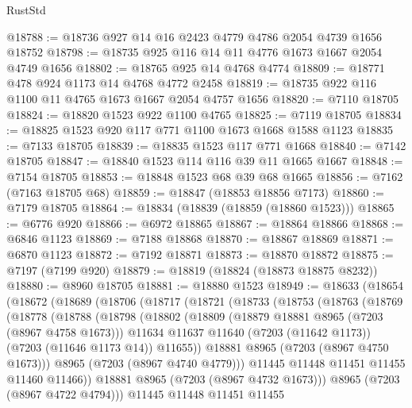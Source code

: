 \begin{lexlean}{RustStd}
\begin{coremodule}
@18788 := @18736 @927 @14 @16 @2423 @4779 @4786 @2054 @4739 @1656 @18752
@18798 := @18735 @925 @116 @14 @11 @4776 @1673 @1667 @2054 @4749 @1656
@18802 := @18765 @925 @14 @4768 @4774
@18809 := @18771 @478 @924 @1173 @14 @4768 @4772 @2458
@18819 := @18735 @922 @116 @1100 @11 @4765 @1673 @1667 @2054 @4757 @1656
@18820 := @7110 @18705
@18824 := @18820 @1523 @922 @1100 @4765
@18825 := @7119 @18705
@18834 := @18825 @1523 @920 @117 @771 @1100 @1673 @1668 @1588 @1123
@18835 := @7133 @18705
@18839 := @18835 @1523 @117 @771 @1668
@18840 := @7142 @18705
@18847 := @18840 @1523 @114 @116 @39 @11 @1665 @1667
@18848 := @7154 @18705
@18853 := @18848 @1523 @68 @39 @68 @1665
@18856 := @7162 (@7163 @18705 @68)
@18859 := @18847 (@18853 @18856 @7173)
@18860 := @7179 @18705
@18864 := @18834 (@18839 (@18859 (@18860 @1523)))
@18865 := @6776 @920
@18866 := @6972 @18865
@18867 := @18864 @18866
@18868 := @6846 @1123
@18869 := @7188 @18868
@18870 := @18867 @18869
@18871 := @6870 @1123
@18872 := @7192 @18871
@18873 := @18870 @18872
@18875 := @7197 (@7199 @920)
@18879 := @18819 (@18824 (@18873 @18875 @8232))
@18880 := @8960 @18705
@18881 := @18880 @1523
@18949 := @18633
    (@18654
      (@18672
        (@18689
          (@18706
            (@18717
              (@18721
                (@18733
                  (@18753
                    (@18763
                      (@18769
                        (@18778
                          (@18788
                            (@18798
                              (@18802
                                (@18809
                                  (@18879 @18881 @8965 (@7203 (@8967 @4758 @1673)))
                                  @11634
                                  @11637
                                  @11640
                                  (@7203 (@11642 @1173))
                                  (@7203 (@11646 @1173 @14))
                                  @11655))
                              @18881
                              @8965
                              (@7203 (@8967 @4750 @1673)))
                            @8965
                            (@7203 (@8967 @4740 @4779)))
                          @11445
                          @11448
                          @11451
                          @11455
                          @11460
                          @11466))
                      @18881
                      @8965
                      (@7203 (@8967 @4732 @1673)))
                    @8965
                    (@7203 (@8967 @4722 @4794)))
                  @11445
                  @11448
                  @11451
                  @11455

\end{coremodule}
\end{lexlean}

